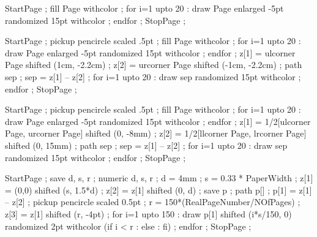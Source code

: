 \NormalHeight        {\textheight}
\PictureFrameHeight  {\textheight}




StartPage ;
fill Page withcolor  ;
for i=1 upto 20 :
 draw Page enlarged -5pt randomized 15pt withcolor  ;
endfor ;
StopPage ;
\stopuseMPgraphic

StartPage ;
pickup pencircle scaled .5pt ;
fill Page withcolor  ;
for i=1 upto 20 :
 draw Page enlarged -5pt randomized 15pt withcolor  ;
endfor ;
z[1] = ulcorner Page shifted (1cm, -2.2cm) ;
z[2] = urcorner Page shifted (-1cm, -2.2cm) ;
path sep ; sep = z[1] -- z[2] ;
for i=1 upto 20 :
 draw sep randomized 15pt withcolor  ;
endfor ;
StopPage ;
\stopuseMPgraphic

StartPage ;
pickup pencircle scaled .5pt ;
fill Page withcolor  ;
for i=1 upto 20 :
 draw Page enlarged -5pt randomized 15pt withcolor  ;
endfor ;
z[1] = 1/2[ulcorner Page, urcorner Page] shifted (0, -8mm) ;
z[2] = 1/2[llcorner Page, lrcorner Page] shifted (0, 15mm) ;
path sep ; sep = z[1] -- z[2] ;
for i=1 upto 20 :
 draw sep randomized 15pt withcolor  ;
endfor ;
StopPage ;
\stopuseMPgraphic

StartPage ;
save d, s, r ; numeric d, s, r ;
d = 4mm ;
s = 0.33 * PaperWidth ;
z[1] = (0,0) shifted (s, 1.5*d) ;
z[2] = z[1] shifted (0, d) ;
save p ; path p[] ;
p[1] = z[1] -- z[2] ;
pickup pencircle scaled 0.5pt ;
r = 150*(RealPageNumber/NOfPages) ;
z[3] = z[1] shifted (r, -4pt) ;
for i=1 upto 150 :
 draw p[1] shifted (i*s/150, 0) randomized 2pt withcolor
 (if i < r : 
      else : 
      fi) ;
endfor ;
StopPage ;
\stopuseMPgraphic

